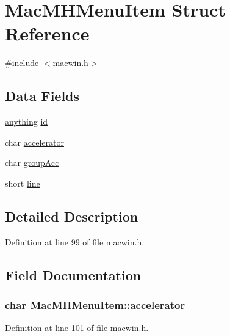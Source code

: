 \hypertarget{structMacMHMenuItem}{\section{Mac\+M\+H\+Menu\+Item Struct Reference}
\label{structMacMHMenuItem}
}


{\ttfamily \#include $<$macwin.\+h$>$}

\subsection*{Data Fields}
\begin{DoxyCompactItemize}
\item 
\hyperlink{wintype_8h_a49720928e6af182ee38aa332d0483b2a}{anything} \hyperlink{structMacMHMenuItem_ab6b99da9d3632f83a43912e5dc25ddf6}{id}
\item 
char \hyperlink{structMacMHMenuItem_a19ed13b1c2fe005f86a1697cbc08bd7c}{accelerator}
\item 
char \hyperlink{structMacMHMenuItem_afeae904d657b8f6a9850231dd438991f}{group\+Acc}
\item 
short \hyperlink{structMacMHMenuItem_a0e9a0b7017f49c63040969a1912fcaf6}{line}
\end{DoxyCompactItemize}


\subsection{Detailed Description}


Definition at line 99 of file macwin.\+h.



\subsection{Field Documentation}
\hypertarget{structMacMHMenuItem_a19ed13b1c2fe005f86a1697cbc08bd7c}{
\subsubsection[{accelerator}]{\setlength{\rightskip}{0pt plus 5cm}char Mac\+M\+H\+Menu\+Item\+::accelerator}}\label{structMacMHMenuItem_a19ed13b1c2fe005f86a1697cbc08bd7c}


Definition at line 101 of file macwin.\+h.



